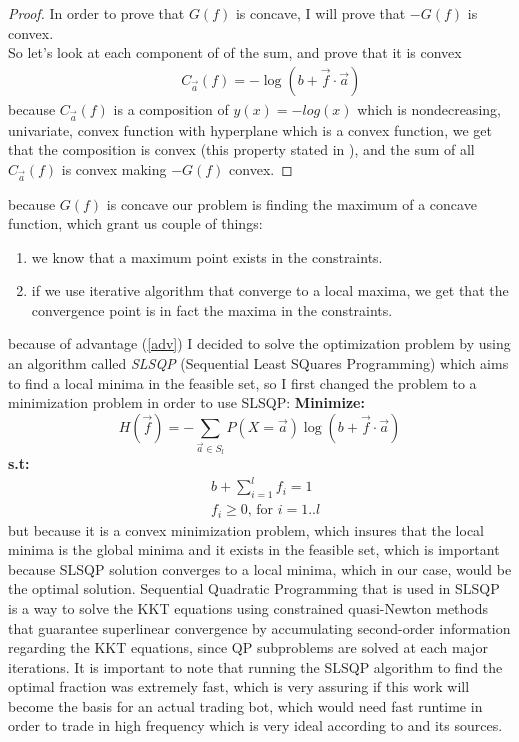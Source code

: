 \documentclass{article}
\begin{document}
	\begin{proof}
		In order to prove that $G(f)$ is concave, I will prove that $-G(f)$ is convex.\\
		So let's look at each component of of the sum, and prove that it is convex
		\[
		\begin{aligned}
			&&C_{\overrightarrow{a}}(f) = -\log(b + \overrightarrow{f} \cdot \overrightarrow{a})
		\end{aligned}
		\]
		because $C_{\overrightarrow{a}}(f)$ is a composition of $y(x) = -log(x)$ which is nondecreasing, univariate, convex function with hyperplane which is a convex function, we get that the composition is convex (this property stated in \cite{NLP}),
		and the sum of all $C_{\overrightarrow{a}}(f)$ is convex making $-G(f)$ convex.
		\newline
	\end{proof}
	because $G(f)$ is concave our problem is finding the maximum of a concave function, which grant us couple of things:
	\begin{enumerate}
		\item we know that a maximum point exists in the constraints.
		\item if we use iterative algorithm that converge to a local maxima, we get that the convergence point is in fact the maxima in the constraints.
		\label{adv}
	\end{enumerate}
	because of advantage (\ref{adv}) I decided to solve the optimization problem by using an algorithm called \textit{SLSQP}\cite{SQP}\cite{Scipy}\cite{matlab}
	(Sequential Least SQuares Programming) which aims to find a local minima in the feasible set, so I first changed the problem to a minimization problem in order to use SLSQP:
	\newpage
	\textbf{Minimize:}
	 \[
	H(\overrightarrow{f}) = -\sum_{\overrightarrow{a} \in S_l} P(X=\overrightarrow{a})\log(b + \overrightarrow{f} \cdot \overrightarrow{a} )
	\]
	\textbf{s.t:}
	\[
	\begin{aligned}
		&b + \sum_{i=1}^{l} f_i = 1\\
		&f_i \ge 0 \text{, for } i=1..l
	\end{aligned}
	\]
	but because it is a convex minimization problem, which insures that the local minima is the global minima and it exists in the feasible set, which is important because SLSQP solution converges to a local minima, which in our case, would be the optimal solution.
	\newline
	Sequential Quadratic Programming that is used in SLSQP is a way to solve the KKT equations using constrained quasi-Newton methods that guarantee superlinear convergence by accumulating second-order information regarding the KKT equations, since QP subproblems are solved at each major iterations.
	\newline\newline
	It is important to note that running the SLSQP algorithm to find the optimal fraction was extremely fast, which is very assuring if this work will become the basis for an actual trading bot, which would need fast runtime in order to trade in high frequency which is very ideal according to \cite{Feng8388} and its sources.
\end{document}
